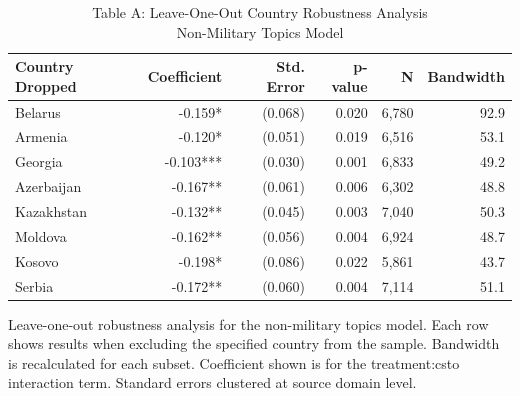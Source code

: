 \begin{table}[!t]
\caption*{
{\large Table A: Leave-One-Out Country Robustness Analysis} \\ 
{\small Non-Military Topics Model}
} 
\fontsize{12.0pt}{14.4pt}\selectfont
\begin{tabular*}{\linewidth}{@{\extracolsep{\fill}}lrrrrr}
\toprule
Country Dropped & Coefficient & Std. Error & p-value & N & Bandwidth \\ 
\midrule\addlinespace[2.5pt]
Belarus & -0.159* & (0.068) & 0.020 & 6,780 & 92.9 \\ 
Armenia & -0.120* & (0.051) & 0.019 & 6,516 & 53.1 \\ 
Georgia & -0.103*** & (0.030) & 0.001 & 6,833 & 49.2 \\ 
Azerbaijan & -0.167** & (0.061) & 0.006 & 6,302 & 48.8 \\ 
Kazakhstan & -0.132** & (0.045) & 0.003 & 7,040 & 50.3 \\ 
Moldova & -0.162** & (0.056) & 0.004 & 6,924 & 48.7 \\ 
Kosovo & -0.198* & (0.086) & 0.022 & 5,861 & 43.7 \\ 
Serbia & -0.172** & (0.060) & 0.004 & 7,114 & 51.1 \\ 
\bottomrule
\end{tabular*}
\begin{minipage}{\linewidth}
Leave-one-out robustness analysis for the non-military topics model. Each row
shows results when excluding the specified country from the sample. Bandwidth
is recalculated for each subset. Coefficient shown is for the treatment:csto
interaction term. Standard errors clustered at source domain level.\\
\end{minipage}
\end{table}

